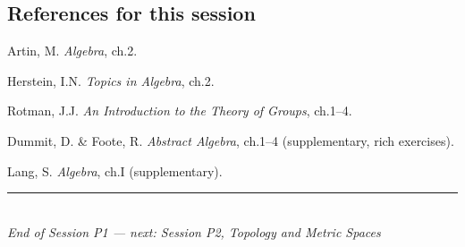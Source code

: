 \documentclass[11pt,a4paper]{article}
\theoremstyle{definition}
\begin{document}
	\subsection*{References for this session}
	\begin{enumerate}[label={[\arabic*]}]
		\item Artin, M. \emph{Algebra}, ch.2.
		\item Herstein, I.N. \emph{Topics in Algebra}, ch.2.
		\item Rotman, J.J. \emph{An Introduction to the Theory of Groups}, ch.1--4.
		\item Dummit, D. \& Foote, R. \emph{Abstract Algebra}, ch.1--4 (supplementary, rich exercises).
		\item Lang, S. \emph{Algebra}, ch.I (supplementary).
	\end{enumerate}
	
	\vspace{1.5em}
	\begin{center}
		\rule{0.6\textwidth}{0.4pt}\\[0.5em]
		\textit{End of Session P1 --- next: Session P2, Topology and Metric Spaces}
	\end{center}
	
\end{document}
